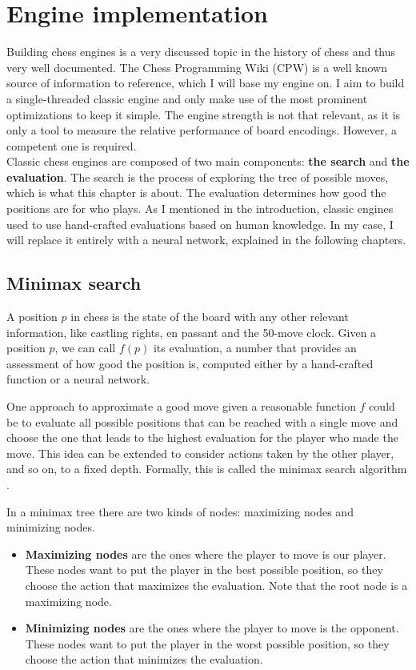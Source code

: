 \section{Engine implementation}

Building chess engines is a very discussed topic in the history of chess and thus very well documented. The Chess Programming Wiki (CPW) \cite{cpw} is a well known source of information to reference, which I will base my engine on. I aim to build a single-threaded classic engine and only make use of the most prominent optimizations to keep it simple. The engine strength is not that relevant, as it is only a tool to measure the relative performance of board encodings. However, a competent one is required. \\

Classic chess engines are composed of two main components: \textbf{the search} and \textbf{the evaluation}. The search is the process of exploring the tree of possible moves, which is what this chapter is about. The evaluation determines how good the positions are for who plays. As I mentioned in the introduction, classic engines used to use hand-crafted evaluations based on human knowledge. In my case, I will replace it entirely with a neural network, explained in the following chapters.

\subsection{Minimax search}

A position $p$ in chess is the state of the board with any other relevant information, like castling rights, en passant and the 50-move clock. Given a position $p$, we can call $f(p)$ its evaluation, a number that provides an assessment of how good the position is, computed either by a hand-crafted function or a neural network.

One approach to approximate a good move given a reasonable function $f$ could be to evaluate all possible positions that can be reached with a single move and choose the one that leads to the highest evaluation for the player who made the move. This idea can be extended to consider actions taken by the other player, and so on, to a fixed depth. Formally, this is called the minimax search algorithm \cite{minimax-survey:1995}.

In a minimax tree there are two kinds of nodes: maximizing nodes and minimizing nodes. 

\begin{itemize}
\item \textbf{Maximizing nodes} are the ones where the player to move is our player. These nodes want to put the player in the best possible position, so they choose the action that maximizes the evaluation. Note that the root node is a maximizing node.
\item \textbf{Minimizing nodes} are the ones where the player to move is the opponent. These nodes want to put the player in the worst possible position, so they choose the action that minimizes the evaluation.
\end{itemize}

